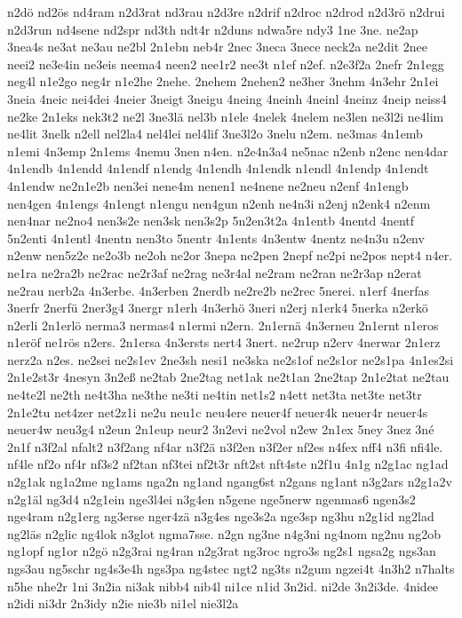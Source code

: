 {n2dö
nd2ös
nd4ram
n2d3rat
nd3rau
n2d3re
n2drif
n2droc
n2drod
n2d3rö
n2drui
n2d3run
nd4sene
nd2spr
nd3th
ndt4r
n2duns
ndwa5re
ndy3
1ne
3ne.
ne2ap
3nea4s
ne3at
ne3au
ne2bl
2n1ebn
neb4r
2nec
3neca
3nece
neck2a
ne2dit
2nee
neei2
ne3e4in
ne3eis
neema4
neen2
nee1r2
nee3t
n1ef
n2ef.
n2e3f2a
2nefr
2n1egg
neg4l
n1e2go
neg4r
n1e2he
2nehe.
2nehem
2nehen2
ne3her
3nehm
4n3ehr
2n1ei
3neia
4neic
nei4dei
4neier
3neigt
3neigu
4neing
4neinh
4neinl
4neinz
4neip
neiss4
ne2ke
2n1eks
nek3t2
ne2l
3ne3lä
nel3b
n1ele
4nelek
4nelem
ne3len
ne3l2i
ne4lim
ne4lit
3nelk
n2ell
nel2la4
nel4lei
nel4lif
3ne3l2o
3nelu
n2em.
ne3mas
4n1emb
n1emi
4n3emp
2n1ems
4nemu
3nen
n4en.
n2e4n3a4
ne5nac
n2enb
n2enc
nen4dar
4n1endb
4n1endd
4n1endf
n1endg
4n1endh
4n1endk
n1endl
4n1endp
4n1endt
4n1endw
ne2n1e2b
nen3ei
nene4m
nenen1
ne4nene
ne2neu
n2enf
4n1engb
nen4gen
4n1engs
4n1engt
n1engu
nen4gun
n2enh
ne4n3i
n2enj
n2enk4
n2enm
nen4nar
ne2no4
nen3s2e
nen3sk
nen3s2p
5n2en3t2a
4n1entb
4nentd
4nentf
5n2enti
4n1entl
4nentn
nen3to
5nentr
4n1ents
4n3entw
4nentz
ne4n3u
n2env
n2enw
nen5z2e
ne2o3b
ne2oh
ne2or
3nepa
ne2pen
2nepf
ne2pi
ne2pos
nept4
n4er.
ne1ra
ne2ra2b
ne2rac
ne2r3af
ne2rag
ne3r4al
ne2ram
ne2ran
ne2r3ap
n2erat
ne2rau
nerb2a
4n3erbe.
4n3erben
2nerdb
ne2re2b
ne2rec
5nerei.
n1erf
4nerfas
3nerfr
2nerfü
2ner3g4
3nergr
n1erh
4n3erhö
3neri
n2erj
n1erk4
5nerka
n2erkö
n2erli
2n1erlö
nerma3
nermas4
n1ermi
n2ern.
2n1ernä
4n3erneu
2n1ernt
n1eros
n1eröf
ne1rös
n2ers.
2n1ersa
4n3ersts
nert4
3nert.
ne2rup
n2erv
4nerwar
2n1erz
nerz2a
n2es.
ne2sei
ne2s1ev
2ne3sh
nesi1
ne3ska
ne2s1of
ne2s1or
ne2s1pa
4n1es2si
2n1e2st3r
4nesyn
3n2eß
ne2tab
2ne2tag
net1ak
ne2t1an
2ne2tap
2n1e2tat
ne2tau
ne4te2l
ne2th
ne4t3ha
ne3the
ne3ti
ne4tin
net1s2
n4ett
net3ta
net3te
net3tr
2n1e2tu
net4zer
net2z1i
ne2u
neu1c
neu4ere
neuer4f
neuer4k
neuer4r
neuer4s
neuer4w
neu3g4
n2eun
2n1eup
neur2
3n2evi
ne2vol
n2ew
2n1ex
5ney
3nez
3né
2n1f
n3f2al
nfalt2
n3f2ang
nf4ar
n3f2ä
n3f2en
n3f2er
nf2es
n4fex
nff4
n3fi
nfi4le.
nf4le
nf2o
nf4r
nf3s2
nf2tan
nf3tei
nf2t3r
nft2st
nft4ste
n2f1u
4n1g
n2g1ac
ng1ad
n2g1ak
ng1a2me
ng1ams
nga2n
ng1and
ngang6st
n2gans
ng1ant
n3g2ars
n2g1a2v
n2g1äl
ng3d4
n2g1ein
nge3l4ei
n3g4en
n5gene
nge5nerw
ngenmas6
ngen3s2
nge4ram
n2g1erg
ng3erse
nger4zä
n3g4es
nge3s2a
nge3sp
ng3hu
n2g1id
ng2lad
ng2läs
n2glic
ng4lok
n3glot
ngma7sse.
n2gn
ng3ne
n4g3ni
ng4nom
ng2nu
ng2ob
ng1opf
ng1or
n2gö
n2g3rai
ng4ran
n2g3rat
ng3roc
ngro3s
ng2s1
ngsa2g
ngs3an
ngs3au
ng5schr
ng4s3e4h
ngs3pa
ng4stec
ngt2
ng3ts
n2gum
ngzei4t
4n3h2
n7halts
n5he
nhe2r
1ni
3n2ia
ni3ak
nibb4
nib4l
ni1ce
n1id
3n2id.
ni2de
3n2i3de.
4nidee
n2idi
ni3dr
2n3idy
n2ie
nie3b
ni1el
nie3l2a
}
